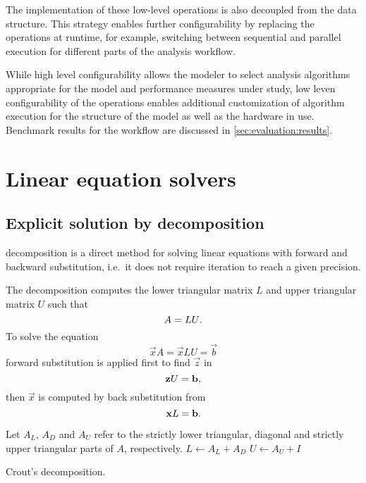 The implementation of these low-level operations is also decoupled
from the data structure. This strategy enables further configurability
by replacing the operations at runtime, for example, switching between
sequential and parallel execution for different parts of the analysis
workflow.

While high level configurability allows the modeler to select analysis
algorithms appropriate for the model and performance measures under
study, low leven configurability of the operations enables additional
customization of algorithm execution for the structure of the model as
well as the hardware in use. Benchmark results for the workflow are
discussed in \vref{sec:evaluation:results}.

\section{Linear equation solvers}

\subsection{Explicit solution by  decomposition}

 decomposition is a direct method for solving linear
equations with forward and backward substitution, i.e.~it does not
require iteration to reach a given precision.

The decomposition computes the lower triangular matrix $L$ and upper
triangular matrix $U$ such that
\begin{equation}
  A = LU \text.
\end{equation}
To solve the equation
\begin{equation}
  \vec{x} A = \vec{x} LU = \vec{b}
\end{equation}
forward substitution is applied first to find $\vec{z}$ in
\begin{equation}
  \vec{z} U = \vec{b}\text,
\end{equation}
then $\vec{x}$ is computed by back substitution from
\begin{equation}
  \vec{x} L = \vec{b}\text.
\end{equation}

\begin{algorithm}
  Let $A_L$, $A_D$ and $A_U$ refer to the strictly lower triangular,
  diagonal and strictly upper triangular parts of $A$, respectively.\;
  $L \gets A_L + A_D$\;
  $U \gets A_U + I$\;
  \;
  \caption{Crout's  decomposition.}
  \label{alg:algorithms:lu:crout}
\end{algorithm}

